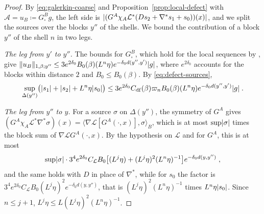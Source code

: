 \documentclass[11pt]{preprint}
\DeclarePairedDelimiter{\abs}{\lvert}{\rvert}
\DeclarePairedDelimiter{\norm}{\lVert}{\rVert}
\numberwithin{equation}{section}
\theoremstyle{definition}
\theoremstyle{remark}
\theoremstyle{plain}
\begin{document}
\begin{proof}
By \eqref{eq:galerkin-coarse} and Proposition~\ref{prop:local-defect} with $\mathcal A = u_B \coloneqq G^B_\square g$, the left side is $\abs{(G^A\chi_A\mathcal L^*(Ds_2 + \nabla^*s_1 + s_0))(x)}$, and we split the sources over the blocks $y''$ of the shells. We bound the contribution of a block $y''$ of the shell $n$ in two legs.

\emph{The leg from $y'$ to $y''$.} The bounds \cite[(3.42), (3.43)]{BalabanPBG} for $G^B_\square$, which hold for the local sequences by \cite[Corollary~3.6, p.~408]{BalabanPBG}, give $\norm{u_B}_{1,\beta;y''} \leq 3e^{2\delta_0}B_0(\beta)(L^n\eta)e^{-\delta_0d(y'', y')}\abs{g}$, where $e^{2\delta_0}$ accounts for the blocks within distance $2$ and $B_0 \leq B_0(\beta)$. By \eqref{eq:defect-sources},
\begin{equation}\label{eq:leg-two}
    \sup_{\Delta(y'')}\bigl(\abs{s_1} + \abs{s_2} + L^n\eta\abs{s_0}\bigr) \leq 3e^{2\delta_0}C_{\mathrm{df}}(\beta)\varpi_nB_0(\beta)(L^n\eta)e^{-\delta_0d(y'', y')}\abs{g}\;.
\end{equation}

\emph{The leg from $y''$ to $y$.} For a source $\sigma$ on $\Delta(y'')$, the symmetry of $G^A$ gives $(G^A\chi_A\mathcal L^*\nabla^*\sigma)(x) = \langle\nabla\mathcal L[G^A(\cdot, x)], \sigma\rangle_B$, which is at most $\sup\abs{\sigma}$ times the block sum of $\nabla\mathcal LG^A(\cdot, x)$. By the hypothesis on $\mathcal L$ and \cite[(3.42)]{BalabanPBG} for $G^A$, this is at most
\begin{equation}\label{eq:leg-one}
    \sup\abs{\sigma}\cdot3^4e^{2\delta_0}C_{\mathcal L}B_0\bigl[(L^j\eta) + (L^j\eta)^2(L^n\eta)^{-1}\bigr]e^{-\delta_0d(y, y'')}\;,
\end{equation}
and the same holds with $D$ in place of $\nabla^*$, while for $s_0$ the factor is $3^4e^{2\delta_0}C_{\mathcal L}B_0(L^j\eta)^2e^{-\delta_0d(y, y'')}$, that is $(L^j\eta)^2(L^n\eta)^{-1}$ times $L^n\eta\abs{s_0}$. Since $n \leq j + 1$, $L^j\eta \leq L(L^j\eta)^2(L^n\eta)^{-1}$.


\end{proof}
\end{document}
